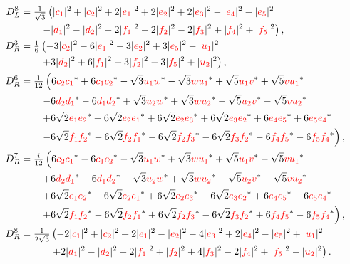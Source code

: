 \documentclass[a4paper,12pt]{article}
\def\RED{\textcolor{red}}
\begin{document}
\begin{align}
D_L^8&=\tfrac{1}{\sqrt{3}}\left(|\RED{c_1}|^2+|\RED{c_2}|^2+2 |\RED{e_1}|^2 +2 |\RED{e_2}|^2 +2 |\RED{e_3}|^2 -|\RED{e_4}|^2 -|\RED{e_5}|^2\right.\nonumber\\
&\qquad \left.-|\RED{d_1}|^2 -|\RED{d_2}|^2-2 |\RED{f_1}|^2 -2 |\RED{f_2}|^2 -2 |\RED{f_3}|^2 +|\RED{f_4}|^2 +|\RED{f_5}|^2\right),\\
D_R^3&=\tfrac{1}{6}\left(
-3 |\RED{c_2}|^2 -6 |\RED{e_1}|^2 -3 |\RED{e_2}|^2 +3 |\RED{e_5}|^2 -|\RED{u_1}|^2 \right.\nonumber\\
&\qquad\left.+3 |\RED{d_2}|^2 +6 |\RED{f_1}|^2 +3 |\RED{f_2}|^2 -3 |\RED{f_5}|^2 +|\RED{u_2}|^2\right),\\
D_R^6&=
\tfrac{1}{12} \left(
6 \RED{c_2} \RED{c_1}^\ast+6 \RED{c_1} \RED{c_2}^\ast
-\sqrt{3} \RED{u_1} \RED{w}^\ast-\sqrt{3}\RED{w} \RED{u_1}^\ast
+\sqrt{5} \RED{u_1} \RED{v}^\ast +\sqrt{5} \RED{v} \RED{u_1}^\ast\right.\nonumber\\
&\qquad\left.-6 \RED{d_2} \RED{d_1}^\ast-6 \RED{d_1} \RED{d_2}^\ast
+\sqrt{3} \RED{u_2} \RED{w}^\ast+\sqrt{3}\RED{w} \RED{u_2}^\ast
-\sqrt{5}\RED{u_2} \RED{v}^\ast -\sqrt{5} \RED{v} \RED{u_2}^\ast\right.\nonumber\\
&\qquad\left.+6\sqrt{2} \RED{e_1} \RED{e_2}^\ast+6\sqrt{2}\RED{e_2} \RED{e_1}^\ast
+6\sqrt{2} \RED{e_2} \RED{e_3}^\ast+6\sqrt{2}\RED{e_3} \RED{e_2}^\ast
+6 \RED{e_4} \RED{e_5}^\ast+6 \RED{e_5} \RED{e_4}^\ast\right.\nonumber\\
&\qquad \left. -6\sqrt{2} \RED{f_1}\RED{f_2}^\ast-6\sqrt{2}\RED{f_2}\RED{f_1}^\ast
-6\sqrt{2} \RED{f_2}\RED{f_3}^\ast-6\sqrt{2}\RED{f_3}\RED{f_2}^\ast
-6 \RED{f_4} \RED{f_5}^\ast-6 \RED{f_5} \RED{f_4}^\ast \right),\\
D_R^7&=
\tfrac{i}{12} \left(
6 \RED{c_2} \RED{c_1}^\ast-6 \RED{c_1} \RED{c_2}^\ast
-\sqrt{3} \RED{u_1} \RED{w}^\ast+\sqrt{3}\RED{w} \RED{u_1}^\ast
+\sqrt{5} \RED{u_1} \RED{v}^\ast -\sqrt{5} \RED{v} \RED{u_1}^\ast\right.\nonumber\\
&\qquad\left.+6 \RED{d_2} \RED{d_1}^\ast-6 \RED{d_1} \RED{d_2}^\ast
-\sqrt{3} \RED{u_2} \RED{w}^\ast+\sqrt{3}\RED{w} \RED{u_2}^\ast
+\sqrt{5}\RED{u_2} \RED{v}^\ast -\sqrt{5} \RED{v} \RED{u_2}^\ast\right.\nonumber\\
&\qquad\left.+6\sqrt{2} \RED{e_1} \RED{e_2}^\ast-6\sqrt{2}\RED{e_2} \RED{e_1}^\ast
+6\sqrt{2} \RED{e_2} \RED{e_3}^\ast-6\sqrt{2}\RED{e_3} \RED{e_2}^\ast
+6 \RED{e_4} \RED{e_5}^\ast-6 \RED{e_5} \RED{e_4}^\ast\right.\nonumber\\
&\qquad \left. +6\sqrt{2} \RED{f_1}\RED{f_2}^\ast-6\sqrt{2}\RED{f_2}\RED{f_1}^\ast
+6\sqrt{2} \RED{f_2}\RED{f_3}^\ast-6\sqrt{2}\RED{f_3}\RED{f_2}^\ast
+6 \RED{f_4} \RED{f_5}^\ast-6 \RED{f_5} \RED{f_4}^\ast \right),\\
D_R^8&=\tfrac{1}{2\sqrt{3}}\left(-2 |\RED{c_1}|^2 +|\RED{c_2}|^2 +2 |\RED{e_1}|^2 -|\RED{e_2}|^2 -4 |\RED{e_3}|^2 +2 |\RED{e_4}|^2 -|\RED{e_5}|^2 +|\RED{u_1}|^2\right.\nonumber\\
&\qquad\quad\left. +2 |\RED{d_1}|^2 -|\RED{d_2}|^2 -2 |\RED{f_1}|^2 +|\RED{f_2}|^2 +4 |\RED{f_3}|^2 -2 |\RED{f_4}|^2 +|\RED{f_5}|^2 -|\RED{u_2}|^2
\right).
\end{align}
\end{document}
